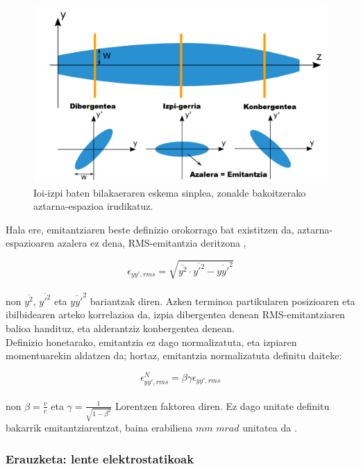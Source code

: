 \documentclass[12pt]{article}
\numberwithin{figure}{section}
\numberwithin{equation}{section}
\begin{document}
\begin{figure}[h]
    \centering
    \includegraphics[width=0.9\linewidth]{2 - Oinarri teorikoa/trace_space.png}
    \caption{Ioi-izpi baten bilakaeraren eskema sinplea, zonalde bakoitzerako aztarna-espazioa irudikatuz.}
    \label{fig:aztarna-espazio}
\end{figure}

Hala ere, emitantziaren beste definizio orokorrago bat existitzen da, aztarna-espazioaren azalera ez dena, RMS-emitantzia deritzona \cite{reiser_theory_2007},

\begin{equation}
    \epsilon_{yy',rms}=\sqrt{\overline{y^2}\cdot\overline{y'^2}-\overline{yy'}^2}
\end{equation}
\\
non $\overline{y^2}$, $\overline{y'^2}$ eta $\overline{yy'}^2$ bariantzak diren. Azken terminoa partikularen posizioaren eta ibilbidearen arteko korrelazioa da, izpia dibergentea denean RMS-emitantziaren balioa handituz, eta alderantziz konbergentea denean. \\

Definizio honetarako, emitantzia ez dago normalizatuta, eta izpiaren momentuarekin aldatzen da; hortaz, emitantzia normalizatuta definitu daiteke:

\begin{equation}
    \epsilon_{yy',rms}^N=\beta \gamma \epsilon_{yy',rms}
\end{equation}
\\
non $\beta=\frac{v}{c}$ eta $\gamma=\frac{1}{\sqrt{1-\beta^2}}$ Lorentzen faktorea diren. Ez dago unitate definitu bakarrik emitantziarentzat, baina erabiliena $mm$ $mrad$ unitatea da \cite{becker_why_2006}.

\subsubsection{Erauzketa: lente elektrostatikoak}
\label{sec:lenteelektrostatiko}
\end{document}
